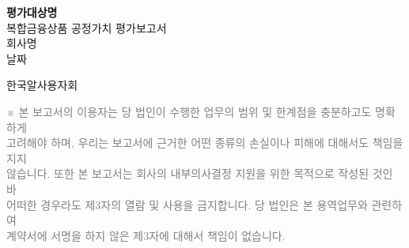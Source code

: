 \documentclass[12pt]{article}
\begin{document}
\vspace*{3cm}

\begin{center}
    {\Huge \bfseries {{ 평가대상명 }}}\\[2.5cm]
    {\Large 복합금융상품 공정가치 평가보고서}\\[3.5cm]
    {\large {{ 회사명 }}}\\[0.5cm]
    {\large {{ 날짜 }}}\\
\end{center}

\vfill

\begin{flushright}
  {\Large 한국알사용자회}
\end{flushright}

\vspace{1cm}

\begin{flushleft}
\small
\textcolor{gray}{
    ※ 본 보고서의 이용자는 당 법인이 수행한 업무의 범위 및 한계점을 충분하고도 명확하게 \\
    고려해야 하며, 우리는 보고서에 근거한 어떤 종류의 손실이나 피해에 대해서도 책임을 지지\\
    않습니다. 또한 본 보고서는 회사의 내부의사결정 지원을 위한 목적으로 작성된 것인 바\\
    어떠한 경우라도 제3자의 열람 및 사용을 금지합니다. 당 법인은 본 용역업무와 관련하여\\
    계약서에 서명을 하지 않은 제3자에 대해서 책임이 없습니다.
}
\end{flushleft}
\end{document}
